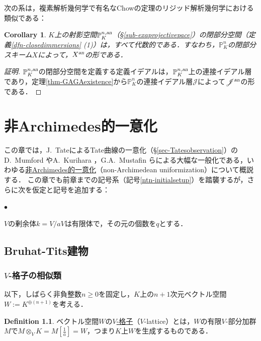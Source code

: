 \documentclass[a4paper,12pt, dvipdfmx]{jsbook}
\def\P{\mathbb{P}}
\def\an{\textsl{an}}
\renewenvironment{itemize}%
{%
   \begin{list}{\parbox{1zw}{$\bullet$}}%
   {%
      \setlength{\topsep}{.5zh}
      \setlength{\itemindent}{0zw}
      \setlength{\leftmargin}{3zw}%
      \setlength{\rightmargin}{0zw}%
      \setlength{\labelsep}{.5zw}%
      \setlength{\labelwidth}{3zw}%
      \setlength{\itemsep}{0.2em}%
      \setlength{\parsep}{0em}%
      \setlength{\listparindent}{0zw}%
   }
}{%
   \end{list}%
}
\theoremstyle{plain}
\newtheorem{cor}[thm]{\bfseries Corollary}
\theoremstyle{definition}
\newtheorem{dfn}[thm]{\bfseries Definition}
\newcounter{chushaku}
\begin{document}
次の系は，複素解析幾何学で有名なChowの定理のリジッド解析幾何学における類似である：
\begin{cor}\label{cor-GAGAexistence}{\rm 
$K$上の射影空間$\P^{n,\an}_K$（\S\ref{sub-exaprojectivepace}）の閉部分空間（定義\ref{dfn-closedimmersions} (1)）は，すべて代数的である．すなわち，$\P^n_K$の閉部分スキーム$X$によって，$X^{\an}$の形である．}
\end{cor}

\begin{proof}[証明]
$\P^{n,\an}_K$の閉部分空間を定義する定義イデアルは，$\P^{n,\an}_K$上の連接イデアル層であり，定理{\rm \ref{thm-GAGAexistence}}から$\P^n_K$の連接イデアル層$\mathscr{J}$によって$\mathscr{J}^{\an}$の形である．
\end{proof}








\setcounter{chushaku}{0}
\chapter{非Archimedes的一意化}\label{CH-UNIFORMIZATION}
この章では，J.\ TateによるTate曲線の一意化（\S\ref{sec-Tatesobservation}）のD.\ Mumford \cite{Mumf1}やA.\ Kurihara \cite{Kuri}，G.A.\ Mustafin \cite{Must}らによる大幅な一般化である，いわゆる\underline{非Archimedes的一意化}（non-Archimedean uniformization）について概説する．
この章でも前章までの記号系（記号\ref{ntn-initialsetup}）を踏襲するが，さらに次を仮定と記号を追加する：
\begin{itemize}
\item $V$の剰余体$k=V/aV$は有限体で，その元の個数を$q$とする．
\end{itemize}

\section{Bruhat-Tits建物}\label{sec-building}
\subsection{$V$-格子の相似類}\label{sub-Vlattices}
以下，しばらく非負整数$n\geq 0$を固定し，$K$上の$n+1$次元ベクトル空間$W:=K^{\oplus (n+1)}$を考える．
\begin{dfn}\label{dfn-lattices}{\rm 
ベクトル空間$W$の\underline{$V$-格子}（$V$-lattice）とは，$W$の有限$V$-部分加群$M$で$M\otimes_VK=M[\frac{1}{a}]=W$，つまり$K$上$W$を生成するものである．}\end{dfn}
\end{document}
